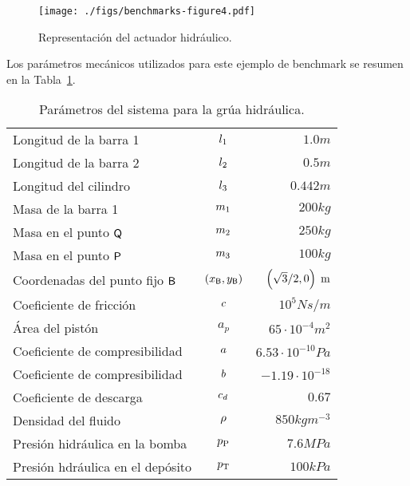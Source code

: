 \begin{figure}[ht!]\centering
	\texttt{[image: ./figs/benchmarks-figure4.pdf]}
	\caption{Representación del actuador hidráulico.}
	\label{fig:GruaActuador}
\end{figure}

Los parámetros mecánicos utilizados para este ejemplo de benchmark se resumen en la Tabla~\ref{tab:HCpp}.
\begin{table}[ht]
\caption{Parámetros del sistema para la grúa hidráulica.}
\begin{center}
	\label{tab:HCpp}
	{
		\renewcommand{\arraystretch}{1.25}
		\begin{tabular}{lc@{\qquad}r}
			\hline
			Longitud de la barra 1     	 				& $l_1$          	& $1.0\unit{m}$  \\
			Longitud de la barra 2 						& $l_2$          	& $0.5\unit{m}$  \\
			Longitud del cilindro                    		& $l_3$           & $0.442\unit{m}$\\
			Masa de la barra 1                          & $m_1$             & $200\unit{kg}$ \\
			Masa en el punto $\mathsf{ Q }$               & $m_2$          	& $250\unit{kg}$ \\
			Masa en el punto $\mathsf{ P }$               & $m_3$          	& $100\unit{kg}$ \\
			Coordenadas del punto fijo $\mathsf{ B }$  & $\left( x_{\mathsf{ B }},y_{\mathsf{ B }} \right)$  & $\left( \sqrt{3}/2, 0 \right){\; \mathrm {m}}$ \\
			Coeficiente de fricción    				& $c$           	& $10^5\unit{Ns/m}$ \\
			Área del pistón                        		& $a_p$      			& $65 \cdot 10^{-4}\unit{m^2}$       \\
			Coeficiente de compresibilidad				& $a$	& $6.53\cdot10^{-10}\unit{Pa}$ \\
			Coeficiente de compresibilidad				& $b$	& $-1.19\cdot10^{-18}$ \\
			Coeficiente de descarga					& $c_d$			&		$0.67$	\\
			Densidad del fluido							& $\rho$			&		$850\unit{kgm^{-3}}$	\\
			Presión hidráulica en la bomba 			& $p_{\text{P}}$ & $7.6\unit{MPa}$\\
			Presión hdráulica en el depósito 			& $p_{\text{T}}$ & $100\unit{kPa}$\\
			\hline
		\end{tabular}
	}
\end{center}
\end{table}


